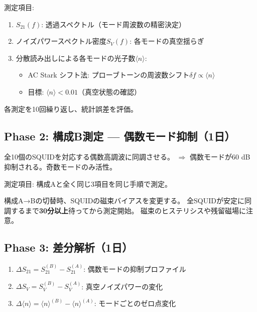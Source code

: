 \documentclass[12pt,a4paper]{article}
\begin{document}
測定項目:
\begin{enumerate}
\item $S_{21}(f)$: 透過スペクトル（モード周波数の精密決定）
\item ノイズパワースペクトル密度$S_V(f)$: 各モードの真空揺らぎ
\item 分散読み出しによる各モードの光子数$\langle n \rangle$:
  \begin{itemize}
  \item AC Stark シフト法: プローブトーンの周波数シフト$\delta f \propto \langle n \rangle$
  \item 目標: $\langle n \rangle < 0.01$（真空状態の確認）
  \end{itemize}
\end{enumerate}

各測定を10回繰り返し、統計誤差を評価。

\subsection{Phase 2: 構成B測定 — 偶数モード抑制（1日）}

\begin{specbox}[構成B: フィルタON（$p=2$ ミュート）]
全10個のSQUIDを対応する偶数高調波に同調させる。
$\Rightarrow$ 偶数モードが60 dB抑制される。奇数モードのみ活性。
\end{specbox}

測定項目: 構成Aと全く同じ3項目を同じ手順で測定。

\begin{warnbox}
構成A→Bの切替時、SQUIDの磁束バイアスを変更する。
全SQUIDが安定に同調するまで\textbf{30分以上}待ってから測定開始。
磁束のヒステリシスや残留磁場に注意。
\end{warnbox}

\subsection{Phase 3: 差分解析（1日）}

\begin{enumerate}
\item $\Delta S_{21} = S_{21}^{(B)} - S_{21}^{(A)}$: 偶数モードの抑制プロファイル
\item $\Delta S_V = S_V^{(B)} - S_V^{(A)}$: 真空ノイズパワーの変化
\item $\Delta\langle n \rangle = \langle n \rangle^{(B)} - \langle n \rangle^{(A)}$: モードごとのゼロ点変化
\end{enumerate}
\end{document}
